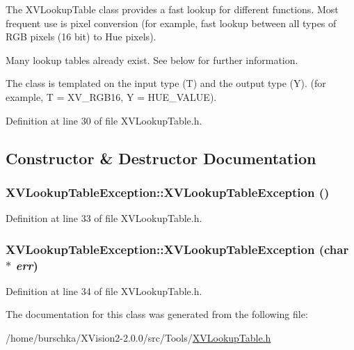The XVLookup\-Table class provides a fast lookup for different functions. Most frequent use is pixel conversion (for example, fast lookup between all types of RGB pixels (16 bit) to Hue pixels).

Many lookup tables already exist. See below for further information.

The class is templated on the input type (T) and the output type (Y). (for example, T = XV\_\-RGB16, Y = HUE\_\-VALUE). 



Definition at line 30 of file XVLookup\-Table.h.

\subsection{Constructor \& Destructor Documentation}
\label{XVLookupTableException_a0}
\hypertarget{class_XVLookupTableException_a0}{
\subsubsection[XVLookupTableException]{\setlength{\rightskip}{0pt plus 5cm}XVLookup\-Table\-Exception::XVLookup\-Table\-Exception ()}}




Definition at line 33 of file XVLookup\-Table.h.\label{XVLookupTableException_a1}
\hypertarget{class_XVLookupTableException_a1}{
\subsubsection[XVLookupTableException]{\setlength{\rightskip}{0pt plus 5cm}XVLookup\-Table\-Exception::XVLookup\-Table\-Exception (char $\ast$ {\em err})}}




Definition at line 34 of file XVLookup\-Table.h.

The documentation for this class was generated from the following file:\begin{CompactItemize}
\item 
/home/burschka/XVision2-2.0.0/src/Tools/\hyperlink{XVLookupTable.h-source}{XVLookup\-Table.h}\end{CompactItemize}
